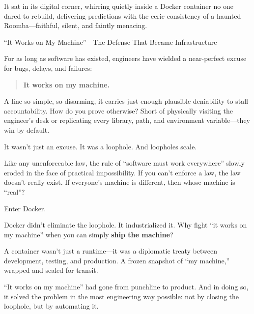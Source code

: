 It sat in its digital corner, whirring quietly inside a Docker container no one dared to rebuild, delivering predictions with the eerie consistency of a haunted Roomba—faithful, silent, and faintly menacing.

\begin{HistoricalSidebar}{“It Works on My Machine”—The Defense That Became Infrastructure}

For as long as software has existed, engineers have wielded a near-perfect excuse for bugs, delays, and failures:  

\begin{quote}
\textbf{It works on my machine.}
\end{quote}

A line so simple, so disarming, it carries just enough plausible deniability to stall accountability.  
How do you prove otherwise? Short of physically visiting the engineer’s desk or replicating every library, path, and environment variable—they win by default.

\medskip

It wasn’t just an excuse. It was a loophole.  
And loopholes scale.

\medskip

Like any unenforceable law, the rule of “software must work everywhere” slowly eroded in the face of practical impossibility. If you can’t enforce a law, the law doesn’t really exist.  
If everyone’s machine is different, then whose machine is “real”?

\medskip

\noindent Enter Docker.

\medskip

Docker didn’t eliminate the loophole. It industrialized it.  
Why fight “it works on my machine” when you can simply \textbf{ship the machine}?

\medskip

A container wasn’t just a runtime—it was a diplomatic treaty between development, testing, and production.  
A frozen snapshot of “my machine,” wrapped and sealed for transit.

\medskip

``It works on my machine'' had gone from punchline to product.  
And in doing so, it solved the problem in the most engineering way possible:  
not by closing the loophole, but by automating it.

\end{HistoricalSidebar}



